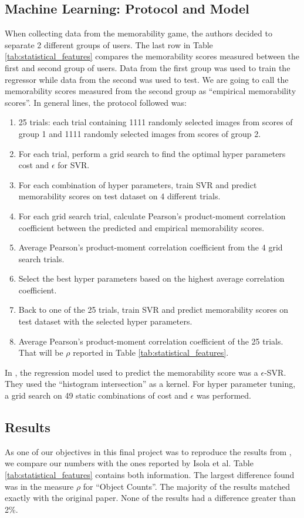 \documentclass[10pt,twocolumn,letterpaper]{article}
\begin{document}
\subsection{Machine Learning: Protocol and Model}
When collecting data from the memorability game, the authors decided to separate 2 different groups of users. The last row in Table \ref{tab:statistical_features} compares the memorability scores measured between the first and second group of users. Data from the first group was used to train the regressor while data from the second was used to test. We are going to call the memorability scores measured from the second group as ``empirical memorability scores''. In general lines, the protocol followed was:
\begin{enumerate}
\item 25 trials: each trial containing 1111 randomly selected images from scores of group 1 and 1111 randomly selected images from scores of group 2.
\item For each trial, perform a grid search to find the optimal hyper parameters cost and $\epsilon$ for SVR.
\item For each combination of hyper parameters, train SVR and predict memorability scores on test dataset on 4 different trials.
\item For each grid search trial, calculate Pearson's product-moment correlation coefficient between the predicted and empirical memorability scores.
\item Average Pearson's product-moment correlation coefficient from the 4 grid search trials.
\item Select the best hyper parameters based on the highest average correlation coefficient.
\item Back to one of the 25 trials, train SVR and predict memorability scores on test dataset with the selected hyper parameters.
\item Average Pearson's product-moment correlation coefficient of the 25 trials. That will be $\rho$ reported in Table \ref{tab:statistical_features}.
\end{enumerate}

In \cite{Isola2011}, the regression model used to predict the memorability score was a $\epsilon$-SVR. They used the ``histogram intersection'' as a kernel. For hyper parameter tuning, a grid search on 49 static combinations of cost and $\epsilon$ was performed.

\subsection{Results}
As one of our objectives in this final project was to reproduce the results from \cite{Isola2011}, we compare our numbers with the ones reported by Isola et al. Table \ref{tab:statistical_features} contains both information. The largest difference found was in the measure $\rho$ for ``Object Counts''. The majority of the results matched exactly with the original paper. None of the results had a difference greater than 2\%.
\end{document}
